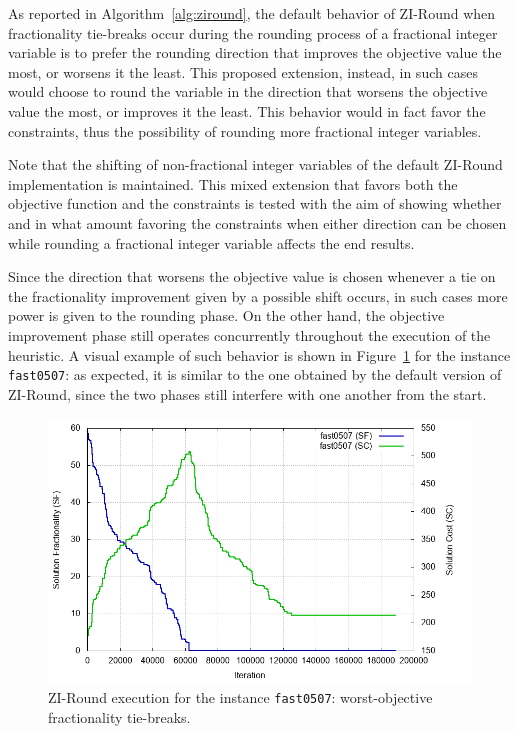 \documentclass[a4paper,12pt]{book}
\begin{document}
As reported in Algorithm~\ref{alg:ziround}, the default behavior of ZI-Round when fractionality tie-breaks occur during the rounding process of a fractional integer variable is to prefer the rounding direction that improves the objective value the most, or worsens it the least. This proposed extension, instead, in such cases would choose to round the variable in the direction that worsens the objective value the most, or improves it the least. This behavior would in fact favor the constraints, thus the possibility of rounding more fractional integer variables. \par

Note that the shifting of non-fractional integer variables of the default ZI-Round implementation is maintained. This mixed extension that favors both the objective function and the constraints is tested with the aim of showing whether and in what amount favoring the constraints when either direction can be chosen while rounding a fractional integer variable affects the end results. \par 

Since the direction that worsens the objective value is chosen whenever a tie on the fractionality improvement given by a possible shift occurs, in such cases more power is given to the rounding phase. On the other hand, the objective improvement phase still operates concurrently throughout the execution of the heuristic. A visual example of such behavior is shown in Figure~\ref{fig:exzi-fractieworstobj} for the instance \texttt{fast0507}: as expected, it is similar to the one obtained by the default version of ZI-Round, since the two phases still interfere with one another from the start.
\begin{figure}[ht]
	\centering
	\includegraphics[width=\textwidth]{fast0507-fractieworstobj.png}
	\caption{ZI-Round execution for the instance \texttt{fast0507}: worst-objective fractionality tie-breaks.}
	\label{fig:exzi-fractieworstobj}
\end{figure}
\end{document}
